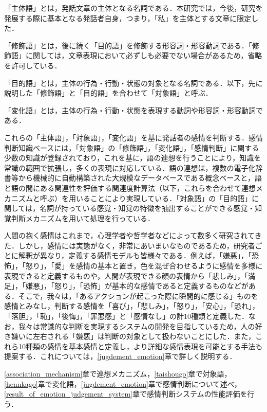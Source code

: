 \documentclass[japanese]{jnlp_1.3a}
\begin{document}
「主体語」とは，発話文章の主体となる名詞である．本研究では，今後，研究を発展する際に基本となる発話者自身，つまり，「私」を主体とする文章に限定した．

「修飾語」とは，後に続く「目的語」を修飾する形容詞・形容動詞である．「修飾語」に関しては，文章表現において必ずしも必要でない場合があるため，省略を許可している．

「目的語」とは，主体の行為・行動・状態の対象となる名詞である．以下，先に説明した「修飾語」と「目的語」を合わせて「対象語」と呼ぶ．

「変化語」とは，主体の行為・行動・状態を表現する動詞や形容詞・形容動詞である．

これらの「主体語」，「対象語」，「変化語」を基に発話者の感情を判断する．感情判断知識ベースには，「対象語」の「修飾語」，「変化語」，「感情判断」に関する少数の知識が登録されており，これを基に，語の連想を行うことにより，知識を常識の範囲で拡張し，多くの表現に対応している．語の連想は，複数の電子化辞書等から機械的に自動構築された大規模なデータベースである概念ベース\cite{hirose:02,kojima:02}と，語と語の間にある関連性を評価する関連度計算法\cite{watabe:01}（以下，これらを合わせて連想メカニズムと呼ぶ）を用いることにより実現している．「対象語」の「目的語」に関しては，名詞が持っている感覚・知覚の特徴を抽出することができる感覚・知覚判断メカニズム\cite{horiguchi:02,watabe:04,kometani:03}を用いて処理を行っている．

人間の抱く感情はこれまで，心理学者や哲学者などによって数多く研究されてきた\cite{hukui:90,saitou:86,rita:99,suzan:01}．しかし，感情には実態がなく，非常にあいまいなものであるため，研究者ごとに解釈が異なり，定義する感情モデルも皆様々である．例えば，「嫌悪」，「恐怖」，「怒り」，「愛」を感情の基本と置き，色を混ぜ合わせるように感情を多様に表現できると定義するもの\cite{rita:99}や，人間が表現できる顔の表情から「悲しみ」，「満足」，「嫌悪」，「怒り」，「恐怖」が基本的な感情であると定義するもの\cite{suzan:01}などがある．そこで，我々は，「あるアクションが起こった際に瞬間的に感じる」ものを感情とみなし，判断する感情を「喜び」，「悲しみ」，「怒り」，「安心」，「恐れ」，「落胆」，「恥」，「後悔」，「罪悪感」と「感情なし」の計10種類と定義した．なお，我々は常識的な判断を実現するシステムの開発を目指しているため，人の好き嫌いに左右される「嫌悪」は判断の対象として扱わないことにした．また，これら10種類の感情を基本感情と定義し，より詳細な感情表現を可能とする手法も提案する．これについては，\ref{jugdement_emotion}章で詳しく説明する．


\ref{association_mechanism}章で連想メカニズム，\ref{taishougo}章で対象語，\ref{hennkago}章で変化語，\ref{jugdement_emotion}章で感情判断について述べ，\ref{result_of_emotion_judgement_system}章で感情判断システムの性能評価を行う．
\end{document}
